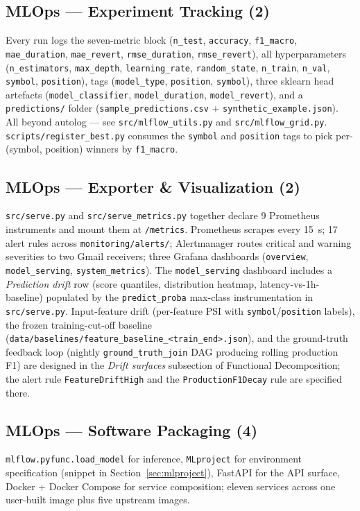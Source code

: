 \documentclass[11pt,a4paper]{article}
\begin{document}
\subsection*{MLOps --- Experiment Tracking (2)}
Every run logs the seven-metric block (\texttt{n\_test}, \texttt{accuracy}, \texttt{f1\_macro}, \texttt{mae\_duration}, \texttt{mae\_revert}, \texttt{rmse\_duration}, \texttt{rmse\_revert}), all hyperparameters (\texttt{n\_estimators}, \texttt{max\_depth}, \texttt{learning\_rate}, \texttt{random\_state}, \texttt{n\_train}, \texttt{n\_val}, \texttt{symbol}, \texttt{position}), tags (\texttt{model\_type}, \texttt{position}, \texttt{symbol}), three sklearn head artefacts (\texttt{model\_classifier}, \texttt{model\_duration}, \texttt{model\_revert}), and a \texttt{predictions/} folder (\texttt{sample\_predictions.csv} + \texttt{synthetic\_example.json}). 
\\
All beyond autolog --- see \texttt{src/mlflow\_utils.py} and \texttt{src/mlflow\_grid.py}. \texttt{scripts/register\_best.py} consumes the \texttt{symbol} and \texttt{position} tags to pick per-(symbol, position) winners by \texttt{f1\_macro}.

\subsection*{MLOps --- Exporter \& Visualization (2)}
\texttt{src/serve.py} and \texttt{src/serve\_metrics.py} together declare 9 Prometheus instruments and mount them at \texttt{/metrics}. Prometheus scrapes every 15~s; 17 alert rules across \texttt{monitoring/alerts/}; Alertmanager routes critical and warning severities to two Gmail receivers; three Grafana dashboards (\texttt{overview}, \texttt{model\_serving}, \texttt{system\_metrics}). The \texttt{model\_serving} dashboard includes a \emph{Prediction drift} row (score quantiles, distribution heatmap, latency-vs-1h-baseline) populated by the \texttt{predict\_proba} max-class instrumentation in \texttt{src/serve.py}. Input-feature drift (per-feature PSI with \texttt{symbol}/\texttt{position} labels), the frozen training-cut-off baseline (\texttt{data/baselines/feature\_baseline\_<train\_end>.json}), and the ground-truth feedback loop (nightly \texttt{ground\_truth\_join} DAG producing rolling production F1) are designed in the \emph{Drift surfaces} subsection of Functional Decomposition; the alert rule \texttt{FeatureDriftHigh} and the \texttt{ProductionF1Decay} rule are specified there.

\subsection*{MLOps --- Software Packaging (4)}
\texttt{mlflow.pyfunc.load\_model} for inference, \texttt{MLproject} for environment specification (snippet in Section~\ref{sec:mlproject}), FastAPI for the API surface, Docker + Docker Compose for service composition; eleven services across one user-built image plus five upstream images.
\end{document}
